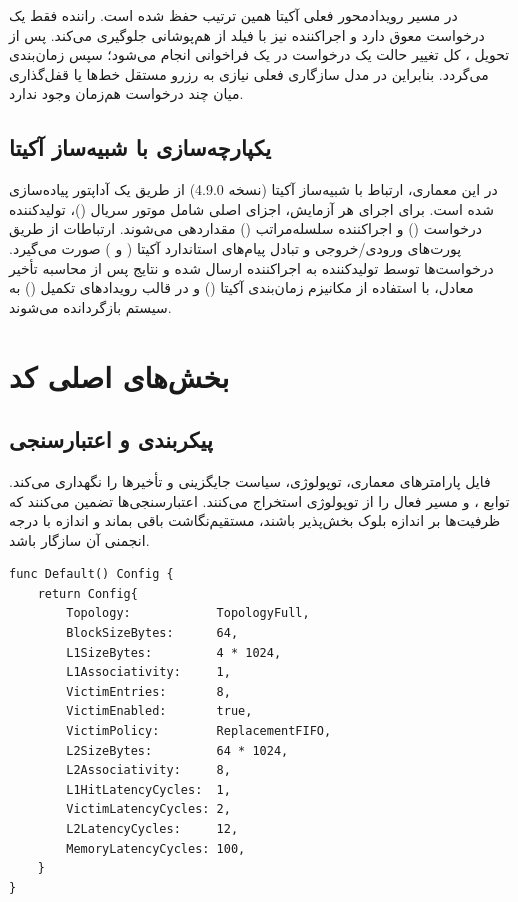 \documentclass[oneside,a4paper,12pt]{article}
\newcommand{\مهم}[1]{\textbf{#1}}
\newcommand{\درصد}[1]{\lr{#1\%}}
\begin{document}
در مسیر رویدادمحور فعلی آکیتا همین ترتیب حفظ شده است. راننده فقط یک درخواست معوق دارد و اجراکننده نیز با فیلد  از هم‌پوشانی جلوگیری می‌کند. پس از تحویل ، کل تغییر حالت یک درخواست در یک فراخوانی  انجام می‌شود؛ سپس  زمان‌بندی می‌گردد. بنابراین در مدل سازگاری فعلی نیازی به رزرو مستقل خط‌ها یا قفل‌گذاری میان چند درخواست هم‌زمان وجود ندارد.

\subsection{یکپارچه‌سازی با شبیه‌ساز آکیتا}

در این معماری، ارتباط با شبیه‌ساز آکیتا (نسخه 4.9.0) از طریق یک آداپتور پیاده‌سازی شده است. برای اجرای هر آزمایش، اجزای اصلی شامل موتور سریال ()، تولیدکننده درخواست () و اجراکننده سلسله‌مراتب () مقداردهی می‌شوند. ارتباطات از طریق پورت‌های ورودی/خروجی و تبادل پیام‌های استاندارد آکیتا ( و ) صورت می‌گیرد. درخواست‌ها توسط تولیدکننده به اجراکننده ارسال شده و نتایج پس از محاسبه تأخیر معادل، با استفاده از مکانیزم زمان‌بندی آکیتا () و در قالب رویدادهای تکمیل () به سیستم بازگردانده می‌شوند.

\section{بخش‌های اصلی کد}

\subsection{پیکربندی و اعتبارسنجی}

فایل  پارامترهای معماری، توپولوژی، سیاست جایگزینی و تأخیرها را نگهداری می‌کند. توابع ،  و  مسیر فعال را از توپولوژی استخراج می‌کنند. اعتبارسنجی‌ها تضمین می‌کنند که ظرفیت‌ها بر اندازه بلوک بخش‌پذیر باشند،  مستقیم‌نگاشت باقی بماند و اندازه  با درجه انجمنی آن سازگار باشد.

\begin{latin}
\begin{lstlisting}[caption={\lr{Default hierarchy configuration}},label={lst:config}]
func Default() Config {
    return Config{
        Topology:            TopologyFull,
        BlockSizeBytes:      64,
        L1SizeBytes:         4 * 1024,
        L1Associativity:     1,
        VictimEntries:       8,
        VictimEnabled:       true,
        VictimPolicy:        ReplacementFIFO,
        L2SizeBytes:         64 * 1024,
        L2Associativity:     8,
        L1HitLatencyCycles:  1,
        VictimLatencyCycles: 2,
        L2LatencyCycles:     12,
        MemoryLatencyCycles: 100,
    }
}
\end{lstlisting}
\end{latin}
\end{document}

